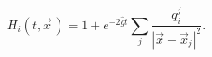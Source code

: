 \begin{equation}
H_i(t,\vec x\,)=1 + e^{-2\hat{g}t}\sum_j{\frac{q_i^j}{|\vec x-\vec x_j|^2}}.
\end{equation}

